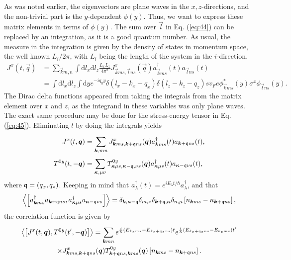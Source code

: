 As was noted earlier, the eigenvectors are plane waves in the $x, z$-directions, and the non-trivial part is the $y$-dependent $\phi (y)$.
Thus, we want to express these matrix elements in terms of $\phi (y)$.
The sum over $\vec{l}$ in Eq. (\ref{eq:44}) can be replaced by an integration, as it is a good quantum number.
As usual, the measure in the integration is given by the density of states in momentum space, the well known $L_{i} /2\pi $, with $L_i$ being the length of the system in the $i$-direction.
\begin{align}
  J^x(t, \vec{q}) &= \sum\limits_{\vec{k}m, n}^{} \int \mathrm{d}l_x \mathrm{d}l_z \frac{L_xL_z}{4 \pi ^2}
                    J^x_{\vec{k}ms, \vec{l}ns} (\vec{q}) a^{\dagger}_{\vec{k} ms} (t) a_{\vec{l} ns}(t)\\
  \nonumber &= \int \mathrm{d}l_x \mathrm{d} l_{z} \int \mathrm{d} y e^{-i q_y y}
                    \delta (l_x - k_x - q_x) \delta (l_z - k_z -  q_z)
                    sv_F e \phi ^{*}_{\vec{k} ms}(y) \sigma ^x \phi _{\vec{l}ns}(y).
\end{align}
The Dirac delta functions appeared from taking the integrals from the matrix element over $x$ and $z$, as the integrand in these variables was only plane waves.
The exact same procedure may be done for the stress-energy tensor in Eq. (\ref{eq:45}).
Eliminating $l$ by doing the integrals yields
\begin{align}
  J^x(t, \bm{q}) &= \sum\limits_{\bm{k}, mn}^{}
                    J^x_{\bm{k}ms, \bm{k}+\mathfrak{q} ns}(\bm{q}) a^{\dagger}_{\bm{k} ms}(t) a_{\bm{k}+\mathfrak{q} ns}(t),\\
  T^{0y}(t, -\bm{q}) &= \sum\limits_{\bm{\kappa}, \mu  \nu }^{} T^{0y}_{\bm{\kappa } \mu  s, \bm{\kappa } - \mathfrak{q}, \nu  s}(\bm{q}) a^{\dagger}_{\bm{\kappa } \mu   s}(t) a_{\bm{\kappa } - \mathfrak{q} \nu  s}(t),
\end{align}
where ${\mathfrak{q}} = (q_x, q_z)$.
Keeping in mind that $a_{\lambda }^{\dagger} (t) = e^{i E_{\lambda } t / \hbar }a_{\lambda }^{\dagger}$, and that
\begin{equation}
  \Braket{\left[
a^{\dagger}_{\bm{k}ms} a_{\bm{k}+\mathfrak{q} ns}, a^{\dagger}_{\bm{\kappa}\mu s} a_{\bm{\kappa}-\mathfrak{q} \nu  s}
\right]}
=
\delta_{\bm{k}, \bm{\kappa}-\mathfrak{q}}
\delta _{m, \nu }
\delta _{\bm{k}+\mathfrak{q}, \bm{\kappa}}
\delta _{n, \mu }
\left[ n_{\bm{k}ms}- n_{\bm{k}+\mathfrak{q} ns} \right],
\end{equation}
the correlation function is given by
\begin{multline}
  \Braket{\left[ J^x(t, \bm{q}), T^{0y}(t', -\bm{q}) \right]}
  =
  \sum\limits_{\bm{k} mn}^{}
  e^{\frac{i}{\hbar }( E_{k_zms} - E_{k_z+\mathfrak{q}_z ns} )t}
  e^{\frac{i}{\hbar }( E_{k_z+\mathfrak{q}_z ns} - E_{k_z ms} ) t'}\\
  \times
  J^x_{\bm{k}ms, \bm{k}+\mathfrak{q}ns}(\bm{q})
  T^{0y}_{\bm{k}+\mathfrak{q}ns, \bm{k}ms}(\bm{q})
  \left[ n_{\bm{k}ms}- n_{\bm{k}+\mathfrak{q} ns} \right].
\end{multline}

